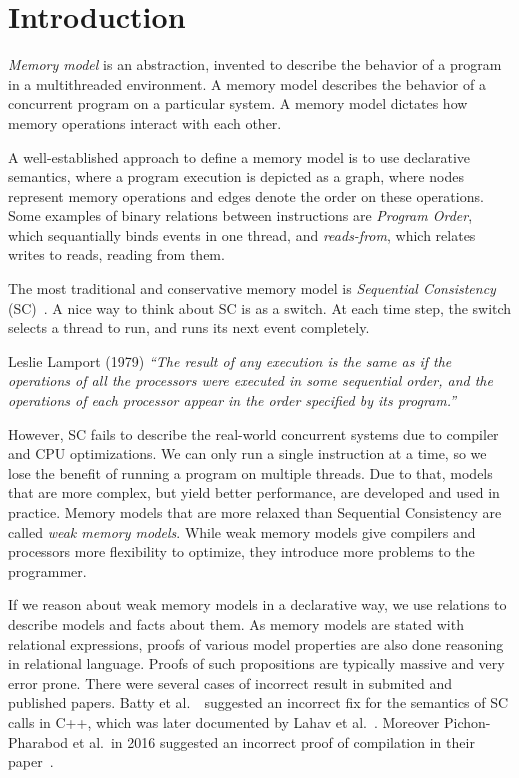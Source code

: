 \section*{Introduction}
\setcounter{section}{1}

\emph{Memory model} is an abstraction, invented to describe the behavior of a program in a multithreaded environment. A memory model describes the behavior of a concurrent program on a particular system. A memory model dictates how memory operations interact with each other. 

A well-established approach to define a memory model is to use declarative semantics, where a program execution is depicted as a graph, where nodes represent memory operations and edges denote the order on these operations. Some examples of binary relations between instructions are \emph{Program Order}, which sequantially binds events in one thread, and \emph{reads-from}, which relates writes to reads, reading from them. 

The most traditional and conservative memory model is \emph{Sequential Consistency} (SC)~\cite{lamport_tc79}. A nice way to think about SC is as a switch. At each time step, the switch selects a thread to run, and runs its next event completely.
\begin{aquote}{Leslie Lamport (1979)}
    \textit{``The result of any execution is the same as if the
    operations of all the processors were executed in
    some sequential order, and the operations of each
    processor appear in the order specified by its
    program.''}
\end{aquote}

However, SC fails to describe the real-world concurrent systems due to compiler and CPU optimizations. We can only run a single instruction at a time, so we lose the benefit of running a program on multiple threads. Due to that, models that are more complex, but yield better performance, are developed and used in practice. Memory models that are more relaxed than Sequential Consistency are called \emph{weak memory models}. While weak memory models give compilers and processors more flexibility to optimize, they introduce more problems to the programmer. 


If we reason about weak memory models in a declarative way, we use relations to describe models and facts about them. As memory models are stated with relational expressions, proofs of various model properties are also done reasoning in relational language. Proofs of such propositions are typically massive and very error prone. There were several cases of incorrect result in submited and published papers. Batty et al.~\cite{batty_2016}\ suggested an incorrect fix for the semantics of SC calls in C++, which was later documented by Lahav et al.~\cite{lahav2017repairing}. Moreover Pichon-Pharabod et al.\  in 2016 suggested an incorrect proof of compilation in their paper~\cite{PichonPharabod_Sewell16}. 

